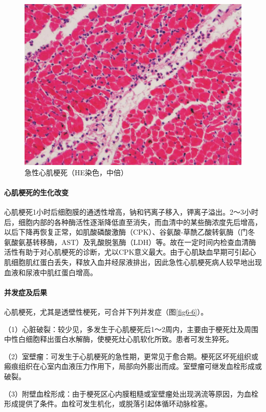 \begin{figure}[!htbp]
    \centering
    \includegraphics{./images/Image00097.jpg}
    \captionsetup{justification=centering}
    \caption{急性心肌梗死（HE染色，中倍）}
    \label{fig6-5}
\end{figure}

\paragraph{心肌梗死的生化改变}
心肌梗死1小时后细胞膜的通透性增高，钠和钙离子移入，钾离子溢出。2～3小时后，细胞内部的各种酶活性逐渐降低直至消失，而血清中的某些酶浓度先后增高，以后下降再恢复正常，如肌酸磷酸激酶（CPK）、谷氨酸-草酰乙酸转氨酶（门冬氨酸氨基转移酶，AST）及乳酸脱氢酶（LDH）等。故在一定时间内检查血清酶活性有助于对心肌梗死的诊断，尤以CPK意义最大。由于心肌缺血早期可引起心肌细胞肌红蛋白丢失，释放入血并经尿液排出，因此急性心肌梗死病人较早地出现血液和尿液中肌红蛋白增高。

\paragraph{并发症及后果}
心肌梗死，尤其是透壁性梗死，可合并下列并发症（图\ref{fig6-6}）。

（1）心脏破裂：较少见，多发生于心肌梗死后1～2周内，主要由于梗死灶及周围中性白细胞释出蛋白水解酶，使梗死灶心肌软化所致。患者可发生猝死。

（2）室壁瘤：可发生于心肌梗死的急性期，更常见于愈合期。梗死区坏死组织或瘢痕组织在心室内血液压力作用下，局部向外膨出而成。室壁瘤可继发血栓形成或破裂。

（3）附壁血栓形成：由于梗死区心内膜粗糙或室壁瘤处出现涡流等原因，为血栓形成提供了条件。血栓可发生机化，或脱落引起体循环动脉栓塞。


